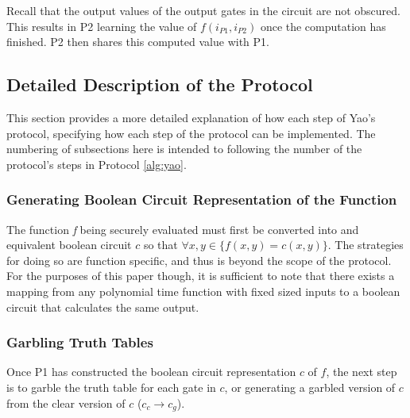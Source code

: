 Recall that the output values of the output gates in the circuit are not obscured. This results in \ac{P2} learning the value of $f(i_{P1}, i_{P2})$ once the computation has finished.  \ac{P2} then shares this computed value with \ac{P1}.


\subsection{Detailed Description of the Protocol}

This section provides a more detailed explanation of how each step of Yao's protocol, specifying how each step of the protocol can be implemented.  The numbering of subsections here is intended to following the number of the protocol's steps in Protocol \ref{alg:yao}.


\subsubsection{Generating Boolean Circuit Representation of the Function}

The function \emph{f} being securely evaluated must first be converted into and equivalent boolean circuit $c$ so that $\forall x, y \in \{f(x, y) = c(x, y)\}$. The strategies for doing so are function specific, and thus is beyond the scope of the protocol.  For the purposes of this paper though, it is sufficient to note that there exists a mapping from any polynomial time function with fixed sized inputs to a boolean circuit that calculates the same output\cite{goldreich1987play}.


\subsubsection{Garbling Truth Tables}

Once \ac{P1} has constructed the boolean circuit representation $c$ of $f$, the next step is to garble the truth table for each gate in $c$, or generating a garbled version of $c$ from the clear version of $c$ ($c_c \to c_g$).

